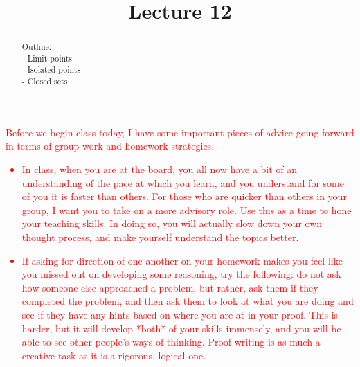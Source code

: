 \documentclass{ximera}
\begin{document}
    \title{Lecture 12}
    
    \begin{abstract}  
    Outline: \\
    - Limit points \\
    - Isolated points \\
    - Closed sets
\end{abstract}

\maketitle

\textcolor{red}{Before we begin class today, I have some important pieces of advice going forward in terms of group work and homework strategies.
\begin{itemize}
    \item In class, when you are at the board, you all now have a bit of an understanding of the pace at which you learn, and you understand for some of you it is faster than others.  For those who are quicker than others in your group, I want you to take on a more advisory role.  Use this as a time to hone your teaching skills.  In doing so, you will actually slow down your own thought process, and make yourself understand the topics better.
    \item If asking for direction of one another on your homework makes you feel like you missed out on developing some reasoning, try the following: do not ask how someone else approached a problem, but rather, ask them if they completed the problem, and then ask them to look at what you are doing and see if they have any hints based on where you are at in your proof.  This is harder, but it will develop *both* of your skills immensely, and you will be able to see other people's ways of thinking.  Proof writing is as much a creative task as it is a rigorous, logical one.
\end{itemize}
}
\end{document}
